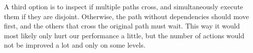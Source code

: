 A third option is to inspect if multiple paths cross, and simultaneously execute them if they are disjoint.
Otherwise, the path without dependencies should move first, and the others that cross the original path must wait.
This way it would most likely only hurt our performance a little, but the number of actions would not be improved a lot and only on some levels.

%



